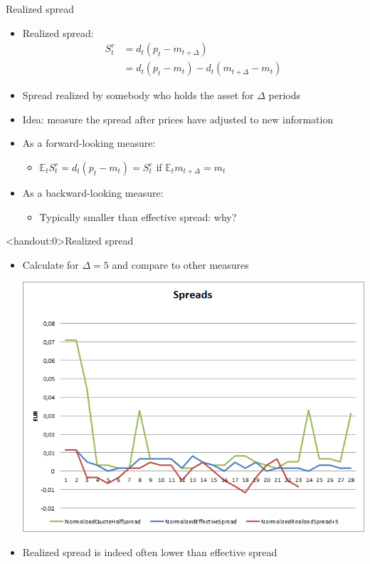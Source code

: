 \documentclass[english,10pt
,aspectratio=169
]{beamer}
\begin{document}
\begin{frame}{Realized spread}
	\begin{itemize}
		\item \alert{Realized spread}:
		\begin{align*}
		S^r_t & = d_t(p_t - m_{t+\Delta}) \\
		& = d_t(p_t-m_t) - d_t(m_{t+\Delta}-m_t)
		\end{align*}
		\item Spread realized by somebody who holds the asset for $\Delta$ periods
		\item Idea: measure the spread after prices have adjusted to new information
		\item As a forward-looking measure:
		\begin{itemize}
			\item $\mathbb{E}_t S_t^r = d_t(p_t - m_t) = S_t^e$ if $\mathbb{E}_t m_{t+\Delta} = m_t$
		\end{itemize}
		\item As a backward-looking measure:
		\begin{itemize}
			\item Typically smaller than effective spread: why?
		\end{itemize}
	\end{itemize}
\end{frame}


\begin{frame}<handout:0>{Realized spread}
	\begin{itemize}
		\item Calculate for $\Delta=5$ and compare to other measures
		\begin{center}
			\includegraphics[scale=0.39]{pics/L2_realizedspread}
		\end{center}
		\item Realized spread is indeed often lower than effective spread
	\end{itemize}
\end{frame}
\end{document}
